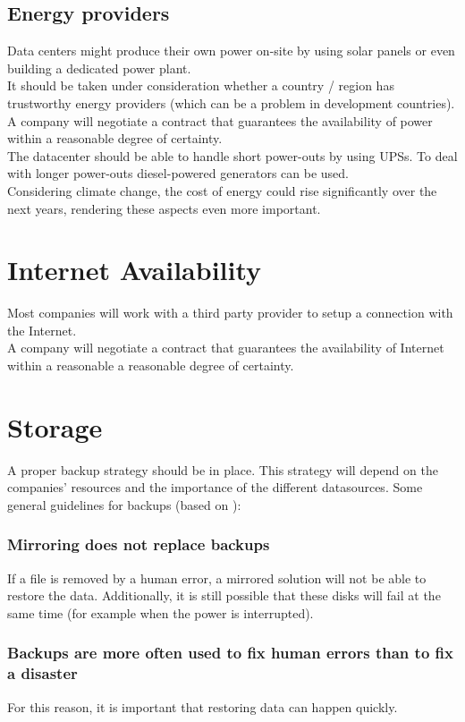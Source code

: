 \documentclass[12pt]{report}
\begin{document}
\subsection{Energy providers}
\label{energy_provider}
Data centers might produce their own power on-site by
using solar panels or even building a dedicated
power plant.\\
It should be taken under consideration whether a country / region has
 trustworthy energy providers (which can be a problem in development 
countries).\\
A company will negotiate a contract that guarantees the availability of power
within a reasonable degree of certainty.\\
The datacenter should be able to handle short power-outs by using
UPSs. To deal with longer power-outs diesel-powered generators can be used.\\
Considering climate change, the cost of energy could rise
significantly over the next years, rendering these aspects even more important.

\section{Internet Availability}
Most companies will work with a third party provider to setup a
connection with the Internet. \\
A company will negotiate a contract that guarantees the availability of Internet
within a reasonable a reasonable degree of certainty.\\

\section{Storage}
A proper backup strategy should be in place. This strategy will depend
on the companies' resources and the importance of the different
datasources.
Some general guidelines for backups (based on \cite{ha_book}):
\subsubsection{Mirroring does not replace backups}
If a file
is removed by a human error, a mirrored solution will not be able to
restore the data.
Additionally, it is still possible that these disks will
fail at the same time
(for example when the power is interrupted).

\subsubsection{Backups are more often used to fix human errors
  than to fix a disaster}
For this reason, it is important that restoring data can happen
quickly.
\end{document}
